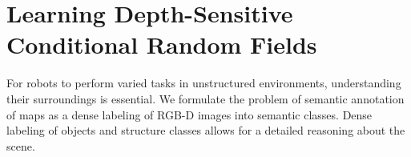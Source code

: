 




\chapter{Learning Depth-Sensitive Conditional Random Fields}\label{ch:nyu}

For robots to perform varied tasks in unstructured environments, understanding their
surroundings is essential. We formulate the problem of semantic annotation of maps
as a dense labeling of RGB-D images into semantic classes. Dense labeling of objects
and structure classes allows for a detailed reasoning about the scene.


